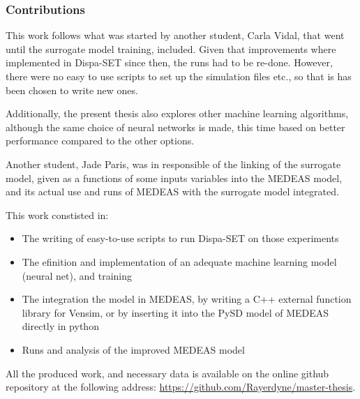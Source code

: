 


\subsubsection{Contributions}

This work follows what was started by another student, Carla Vidal, that went until the surrogate model training, included. Given that improvements where implemented in Dispa-SET since then, the runs had to be re-done. However, there were no easy to use scripts to set up the simulation files etc., so that is has been chosen to write new ones.

Additionally, the present thesis also explores other machine learning algorithms, although the same choice of neural networks is made, this time based on better performance compared to the other options.

Another student, Jade Paris, was in responsible of the linking of the surrogate model, given as a functions of some inputs variables into the MEDEAS model, and its actual use and runs of MEDEAS with the surrogate model integrated.

This work constisted in:
\begin{itemize}
    \item The writing of easy-to-use scripts to run Dispa-SET on those experiments
    \item The efinition and implementation of an adequate machine learning model (neural net), and training
    \item The integration the model in MEDEAS, by writing a C++ external function library for Vensim, or by inserting it into the PySD model of MEDEAS directly in python
    \item Runs and analysis of the improved MEDEAS model
\end{itemize}

All the produced work, and necessary data is available on the online github repository at the following address: \href{https://github.com/Rayerdyne/master-thesis}{https://github.com/Rayerdyne/master-thesis}.

